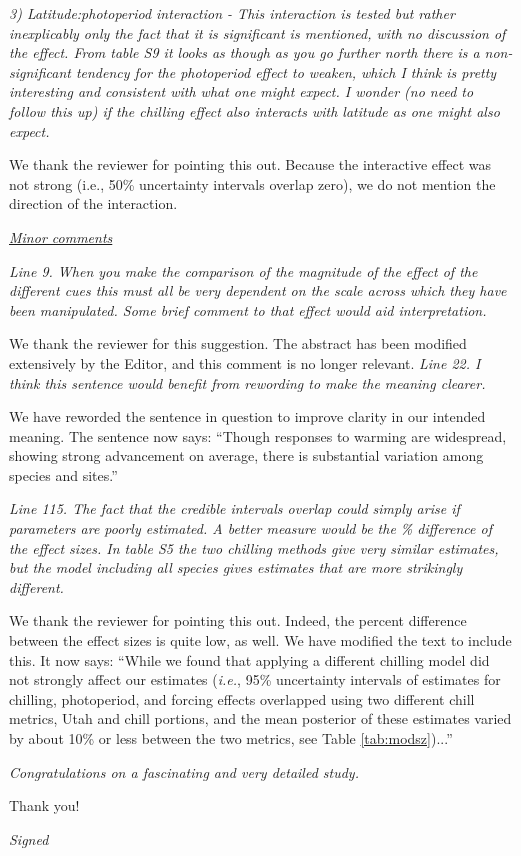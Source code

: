 \documentclass{article}
\begin{document}
\par \emph{3) Latitude:photoperiod interaction - This interaction is tested but rather inexplicably only the fact that it is significant is mentioned, with no discussion of the effect. From table S9 it looks as though as you go further north there is a non-significant tendency for the photoperiod effect to weaken, which I think is pretty interesting and consistent with what one might expect. I wonder (no need to follow this up) if the chilling effect also interacts with latitude as one might also expect.}
\par We thank the reviewer for pointing this out. Because the interactive effect was not strong (i.e., 50\% uncertainty intervals overlap zero), we do not mention the direction of the interaction.  


\underline{\emph{Minor comments}}

\emph{Line 9. When you make the comparison of the magnitude of the effect of the different cues this must all be very dependent on the scale across which they have been manipulated. Some brief comment to that effect would aid interpretation.}
\par We thank the reviewer for this suggestion. The abstract has been modified extensively by the Editor, and this comment is no longer relevant. 
\emph{Line 22. I think this sentence would benefit from rewording to make the meaning clearer.}
\par We have reworded the sentence in question to improve clarity in our intended meaning. The sentence now says:
``Though responses to warming are widespread, showing strong advancement on average, there is substantial variation among species and sites.''
\par \emph{Line 115. The fact that the credible intervals overlap could simply arise if parameters are poorly estimated. A better measure would be the \% difference of the effect sizes. In table S5 the two chilling methods give very similar estimates, but the model including all species gives estimates that are more strikingly different.}
\par We thank the reviewer for pointing this out. Indeed, the percent difference between the effect sizes is quite low, as well. We have modified the text to include this. It now says:
``While we found that applying a different chilling model did not strongly affect our estimates (\emph{i.e.}, 95\% uncertainty intervals of estimates for chilling, photoperiod, and forcing effects overlapped using two different chill metrics, Utah and chill portions, and the mean posterior of these estimates varied by about 10\% or less between the two metrics, see Table \ref{tab:modsz})...''
\par \emph{Congratulations on a fascinating and very detailed study.}
\par Thank you!
\par \emph{Signed}
\end{document}
